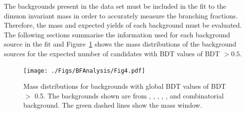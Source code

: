 The backgrounds present in the data set must be included in the fit to the dimuon invariant mass in order to accurately measure the \bmumu branching fractions.
Therefore, the mass \pdfs and expected yields of each background must be evaluated. The following sections summarise the information used for each background source in the \BF fit and Figure~\ref{fig:BFbkgnds} shows the mass distributions of the background sources for the expected number of candidates with BDT values of BDT $> 0.5$.

\begin{figure}[tbp]
    \centering
     \texttt{[image: ./Figs/BFAnalysis/Fig4.pdf]}
     \caption{Mass distributions for \bmumu backgrounds with global BDT values of BDT $>$ 0.5. The backgrounds shown are from \bhh, \bdpimunu, \bsKmunu, \lambdab, \bpimumu, \bcjpsimunu and combinatorial background. The green dashed lines show the \bmumu mass window. }
     \label{fig:BFbkgnds}
\end{figure}

